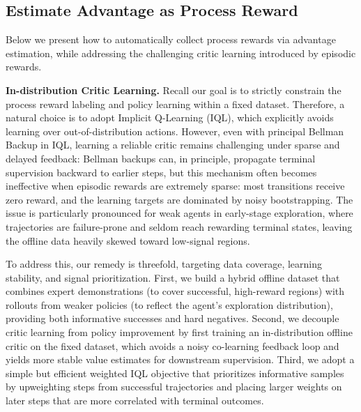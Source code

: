 \documentclass{article}
\theoremstyle{plain}
\theoremstyle{definition}
\theoremstyle{remark}
\begin{document}
\subsection{Estimate Advantage as Process Reward}

Below we present how to automatically collect process rewards via advantage estimation, while addressing the challenging critic learning introduced by episodic rewards.

\textbf{In-distribution Critic Learning.}
\label{sec:iql} Recall our goal is to strictly constrain the process reward labeling and policy learning within a fixed dataset. Therefore, a natural choice is to adopt Implicit Q-Learning (IQL), which explicitly avoids learning over out-of-distribution actions. However, even with principal Bellman Backup in IQL, learning a reliable critic remains challenging under sparse and delayed feedback: Bellman backups can, in principle, propagate terminal supervision backward to earlier steps, but this mechanism often becomes ineffective when episodic rewards are extremely sparse: most transitions receive zero reward, and the learning targets are dominated by noisy bootstrapping. The issue is particularly pronounced for weak agents in early-stage exploration, where trajectories are failure-prone and seldom reach rewarding terminal states, leaving the offline data heavily skewed toward low-signal regions. 

To address this, our remedy is threefold, targeting data coverage, learning stability, and signal prioritization. First, we build a hybrid offline dataset that combines expert demonstrations (to cover successful, high-reward regions) with rollouts from weaker policies (to reflect the agent’s exploration distribution), providing both informative successes and hard negatives. Second, we decouple critic learning from policy improvement by first training an in-distribution offline critic on the fixed dataset, which avoids a noisy co-learning feedback loop and yields more stable value estimates for downstream supervision. Third, we adopt a simple but efficient weighted IQL objective that prioritizes informative samples by upweighting steps from successful trajectories and placing larger weights on later steps that are more correlated with terminal outcomes. 
\end{document}
